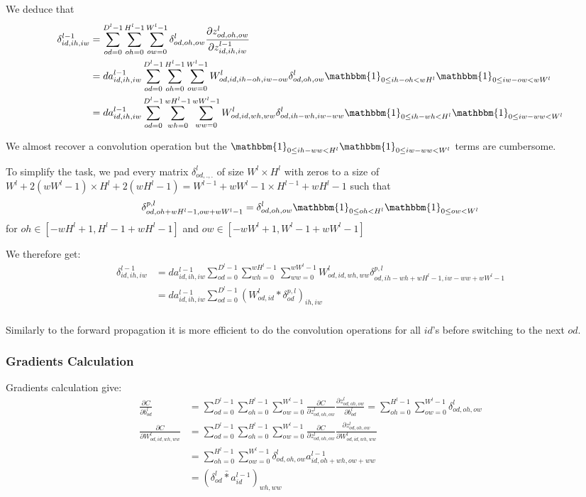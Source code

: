 \documentclass{article} %
\begin{document}
We deduce that
$$
\begin{aligned}
\delta^{l-1}_{id, ih, iw} 
&= \sum_{od=0}^{D^l-1}\sum_{oh=0}^{H^l-1}\sum_{ow=0}^{W^l-1} \delta^l_{od, oh, ow}  \frac{\partial z^l_{od, oh, ow}}{\partial z^{l-1}_{id, ih, iw}}  \\
&= da^{l-1}_{id, ih, iw}\sum_{od=0}^{D^l-1}\sum_{oh=0}^{H^l-1}\sum_{ow=0}^{W^l-1} W^l_{od, id, ih-oh, iw-ow} \delta^l_{od, oh, ow} \mathbbm{1}_{0\leq ih-oh<wH^l}\mathbbm{1}_{0\leq  iw-ow<wW^l} \\
&= da^{l-1}_{id, ih, iw}\sum_{od=0}^{D^l-1}\sum_{wh=0}^{wH^l-1}\sum_{ww=0}^{wW^l-1} W^l_{od, id, wh, ww} \delta^l_{od, ih-wh, iw-ww} \mathbbm{1}_{0\leq ih-wh<H^l}\mathbbm{1}_{0\leq iw- ww<W^l}
\end{aligned}
$$

We almost recover a convolution operation but the $\mathbbm{1}_{0\leq ih-ww<H^l}\mathbbm{1}_{0\leq  iw-ww<W^l}$ terms are cumbersome. 

To simplify the task, we pad every matrix $\delta^l_{od,.,.}$ of size $W^l \times H^l$ with zeros to a size of $W^l+2(wW^l-1) \times H^l+2(wH^l-1)=W^{l-1}+wW^l-1 \times H^{l-1}+wH^l-1$ such that
$$
\delta^{p,l}_{od, oh+wH^l-1, ow+wW^l-1} 
= \delta^l_{od,oh,ow} \mathbbm{1}_{0\leq oh<H^l}\mathbbm{1}_{0\leq ow<W^l}
$$
for $oh \in \left[-wH^l+1, H^l-1+wH^l-1\right]$ and $ow \in \left[-wW^l+1, W^l-1+wW^l-1\right]$

We therefore get:
$$
\begin{aligned}
\delta^{l-1}_{id, ih, iw} 
&= da^{l-1}_{id, ih, iw}\sum_{od=0}^{D^l-1}\sum_{wh=0}^{wH^l-1}\sum_{ww=0}^{wW^l-1} W^l_{od, id, wh, ww} \delta^{p,l}_{od, ih-wh+wH^l-1, iw-ww+wW^l-1} \\
&= da^{l-1}_{id, ih, iw}\sum_{od=0}^{D^l-1} (W^l_{od, id} \ast \delta^{p,l}_{od})_{ih, iw} \\
\end{aligned}
$$

Similarly to the forward propagation it is more efficient to do the convolution operations for all $id$'s before switching to the next $od$.

\subsubsection{Gradients Calculation}
Gradients calculation give:
$$
\begin{aligned}
\frac{\partial C}{\partial b^l_{od}}    
&= \sum_{od=0}^{D^l-1}\sum_{oh=0}^{H^l-1}\sum_{ow=0}^{W^l-1}\frac{\partial C}{\partial z^l_{od,oh,ow}} \frac{\partial z^l_{od,oh,ow}}{\partial b^l_{od}}  = \sum_{oh=0}^{H^l-1}\sum_{ow=0}^{W^l-1}\delta^l_{od,oh,ow} \\
\frac{\partial C}{\partial W^l_{od,id,wh,ww}} 
&= \sum_{od=0}^{D^l-1}\sum_{oh=0}^{H^l-1}\sum_{ow=0}^{W^l-1}\frac{\partial C}{\partial z^l_{od,oh,ow}} \frac{\partial z^l_{od,oh,ow}}{\partial W^l_{od,id,wh,ww}} \\
& = \sum_{oh=0}^{H^l-1}\sum_{ow=0}^{W^l-1}\delta^l_{od,oh,ow} a^{l-1}_{id,oh+wh,ow+ww} \\
& = (\delta^l_{od} \bar{\ast} a^{l-1}_{id})_{wh, ww}
\end{aligned}
$$
\end{document}
